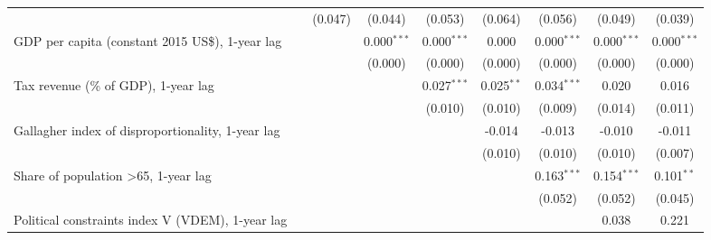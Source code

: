 \begin{table}[htbp]
\begin{tabular}{lcccccccc}
                                                                                                 &                & (0.047)       & (0.044)       & (0.053)       & (0.064)      & (0.056)       & (0.049)       & (0.039)\\   
      GDP per capita (constant 2015 US\$), 1-year lag                                            &                &               & 0.000$^{***}$ & 0.000$^{***}$ & 0.000        & 0.000$^{***}$ & 0.000$^{***}$ & 0.000$^{***}$\\   
                                                                                                 &                &               & (0.000)       & (0.000)       & (0.000)      & (0.000)       & (0.000)       & (0.000)\\   
      Tax revenue (\% of GDP), 1-year lag                                                        &                &               &               & 0.027$^{***}$ & 0.025$^{**}$ & 0.034$^{***}$ & 0.020         & 0.016\\   
                                                                                                 &                &               &               & (0.010)       & (0.010)      & (0.009)       & (0.014)       & (0.011)\\   
      Gallagher index of disproportionality, 1-year lag                                          &                &               &               &               & -0.014       & -0.013        & -0.010        & -0.011\\   
                                                                                                 &                &               &               &               & (0.010)      & (0.010)       & (0.010)       & (0.007)\\   
      Share of population >65, 1-year lag                                                        &                &               &               &               &              & 0.163$^{***}$ & 0.154$^{***}$ & 0.101$^{**}$\\   
                                                                                                 &                &               &               &               &              & (0.052)       & (0.052)       & (0.045)\\   
      Political constraints index V (VDEM), 1-year lag                                           &                &               &               &               &              &               & 0.038         & 0.221\\   

\end{tabular}
\end{table}
